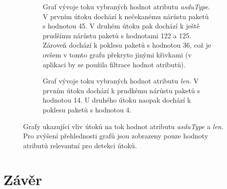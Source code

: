 \begin{figure}[H]%
    \centering
    \begin{subfigure}{\textwidth}
        \centering
        \captionsetup{width=0.9\linewidth}
        \caption{Graf vývoje toku vybraných hodnot atributu \emph{asduType}. V prvním útoku dochází k nečekanému nárůstu paketů s hodnotou 45. V druhém útoku pak dochází k ještě prudšímu nárůstu paketů s hodnotami 122 a 125. Zároveň dochází k poklesu paketů s hodnotou 36, což je ovšem v tomto grafu překryto jinými křivkami (v aplikaci by se použila filtrace hodnot atributů).}
        \label{fig:injection_asdu}
    \end{subfigure}
    
    \begin{subfigure}{\textwidth}
        \centering
        \captionsetup{width=0.9\linewidth}
        \caption{Graf vývoje toku vybraných hodnot atributu \emph{len}. V prvním útoku dochází k prudkému nárůstu paketů s hodnotou 14. U druhého útoku naopak dochází k poklesu paketů s hodnotou 4.}
        \label{fig:injection_len}
    \end{subfigure}
    
    \caption{Grafy ukazující vliv útoků na tok hodnot atributu \emph{asduType} a \emph{len}. Pro zvýšení přehlednosti grafů jsou zobrazeny pouze hodnoty atributů relevantní pro detekci útoků.}%
    \label{fig:injection_both}%
\end{figure}


\chapter{Závěr}

